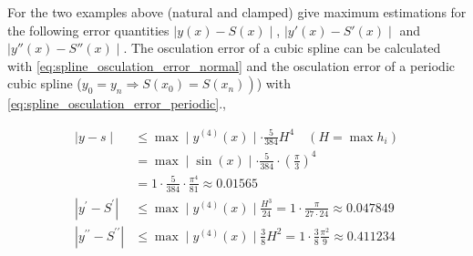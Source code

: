 For the two examples above (natural and clamped) give maximum estimations for the following error quantities $\mid y(x)- S(x)\mid$, $\mid y'(x)- S'(x)\mid$ and $\mid y''(x)- S''(x)\mid$. The osculation error of a cubic spline can be calculated with \autoref{eq:spline_osculation_error_normal} and the osculation error of a periodic cubic spline ($\left.y_0=y_n \Rightarrow S\left(x_0\right)=S\left(x_n\right)\right)$) with \autoref{eq:spline_osculation_error_periodic}.,

$$
\begin{aligned}
\mid y-s \mid & \leq \max \mid y^{(4)}(x) \mid \cdot \frac{5}{384} H^4 \quad\left(H=\max h_i\right) \\
&=\max \mid \sin (x) \mid \cdot \frac{5}{384} \cdot\left(\frac{\pi}{3}\right)^4 \\
&=1 \cdot \frac{5}{384} \cdot \frac{\pi^4}{81} \approx 0.01565 \\
\left|y^{\prime}-S^{\prime}\right| & \leq \max \mid y^{(4)}(x) \mid \frac{H^3}{24}=1 \cdot \frac{\pi}{27 \cdot 24} \approx 0.047849 \\
\left|y^{\prime \prime}-S^{\prime \prime}\right| & \leqslant \max \mid y^{(4)}(x) \mid \frac{3}{8} H^2=1 \cdot \frac{3}{8} \frac{\pi^2}{9} \approx 0.411234
\end{aligned}
$$